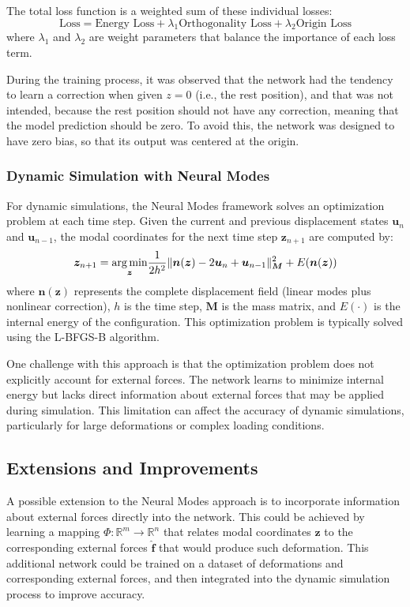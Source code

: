 The total loss function is a weighted sum of these individual losses:
\begin{equation}
    \text{Loss} = \text{Energy Loss} + \lambda_1 \text{Orthogonality Loss} + \lambda_2 \text{Origin Loss}
\end{equation}
where $\lambda_1$ and $\lambda_2$ are weight parameters that balance the importance of each loss term.

During the training process, it was observed that the network had the tendency to learn a correction when given \(z = 0\) (i.e., the rest position), and that was not intended, because the rest position should not have any correction, meaning that the model prediction should be zero. To avoid this, the network was designed to have zero bias, so that its output was centered at the origin.

\subsubsection{Dynamic Simulation with Neural Modes}
For dynamic simulations, the Neural Modes framework solves an optimization problem at each time step. Given the current and previous displacement states $\bm{u}_n$ and $\bm{u}_{n-1}$, the modal coordinates for the next time step $\bm{z}_{n+1}$ are computed by:
\begin{equation}
    \bm{z}_{n+1} = \underset{\bm{z}}{\operatorname*{arg\,min}} \frac{1}{2h^2} \|\bm{n}(\bm{z}) - 2\bm{u}_n + \bm{u}_{n-1}\|_{\bm{M}}^2 + E(\bm{n}(\bm{z}))
\end{equation}
where $\bm{n}(\bm{z})$ represents the complete displacement field (linear modes plus nonlinear correction), $h$ is the time step, $\bm{M}$ is the mass matrix, and $E(\cdot)$ is the internal energy of the configuration. This optimization problem is typically solved using the L-BFGS-B algorithm.

One challenge with this approach is that the optimization problem does not explicitly account for external forces. The network learns to minimize internal energy but lacks direct information about external forces that may be applied during simulation. This limitation can affect the accuracy of dynamic simulations, particularly for large deformations or complex loading conditions.

\subsection{Extensions and Improvements}
A possible extension to the Neural Modes approach is to incorporate information about external forces directly into the network. This could be achieved by learning a mapping $\Phi: \mathbb{R}^m \rightarrow \mathbb{R}^n$ that relates modal coordinates $\bm{z}$ to the corresponding external forces $\hat{\bm{f}}$ that would produce such deformation. This additional network could be trained on a dataset of deformations and corresponding external forces, and then integrated into the dynamic simulation process to improve accuracy.

